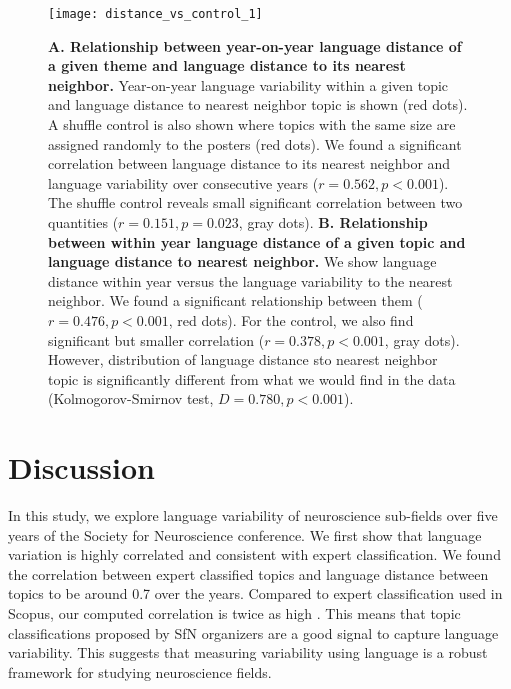 \documentclass[10pt,letterpaper]{article}
\begin{document}
\begin{figure}[ht]
\centering
\texttt{[image: distance\_vs\_control\_1]}
\caption{\textbf{A. Relationship between year-on-year language distance of a given theme and language distance to its nearest neighbor.} Year-on-year language variability within a given topic and language distance to nearest neighbor topic is shown (red dots). A shuffle control is also shown where topics with the same size are assigned randomly to the posters (red dots). We found a significant correlation between language distance to its nearest neighbor and language variability over consecutive years ($r = 0.562, p < 0.001$). The shuffle control reveals small significant correlation between two quantities ($r = 0.151, p = 0.023$, gray dots). \textbf{B. Relationship between within year language distance of a given topic and language distance to nearest neighbor.} We show language distance within year versus the language variability to the nearest neighbor. We found a significant relationship between them ($r = 0.476, p < 0.001$, red dots). For the control, we also find significant but smaller correlation ($r = 0.378, p < 0.001$, gray dots). However, distribution of language distance sto nearest neighbor topic is significantly different from what we would find in the data (Kolmogorov-Smirnov test, $D = 0.780, p < 0.001$).}
\label{fig:control}
\end{figure}


\section*{Discussion}

In this study, we explore language variability of neuroscience sub-fields over five years of the Society for Neuroscience conference. We first show that language variation is highly correlated and consistent with expert classification. We found the correlation between expert classified topics and language distance between topics to be around 0.7 over the years. Compared to expert classification used in Scopus, our computed correlation is twice as high \cite{dias2017using}. This means that topic classifications proposed by SfN organizers are a good signal to capture language variability. This suggests that measuring variability using language is a robust framework for studying neuroscience fields.
\end{document}
